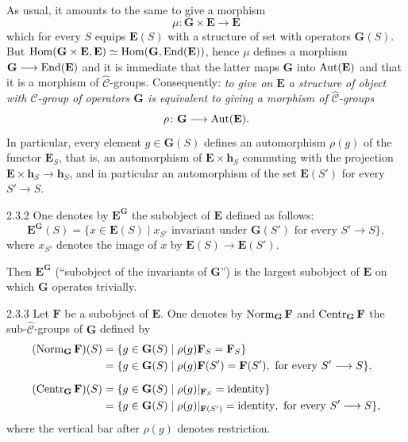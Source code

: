 As usual, it amounts to the same to give a morphism
\[
\mu\colon\mathbf{G}\times\mathbf{E}\to\mathbf{E}
\]
which for every \(S\) equips \(\mathbf{E}(S)\) with a structure of set with
operators \(\mathbf{G}(S)\). But
\(\operatorname{Hom}(\mathbf{G}\times\mathbf{E},\mathbf{E})\simeq\operatorname{Hom}(\mathbf{G},\operatorname{End}(\mathbf{E}))\),
hence \(\mu\) defines a morphism \(\mathbf{G}\longrightarrow\operatorname{End}(\mathbf{E})\) and it is
immediate that the latter maps \(\mathbf{G}\) into \(\operatorname{Aut}(\mathbf{E})\) and
that it is a morphism of \(\widehat{\mathcal{C}}\)-groups. Consequently:
\emph{to give on \(\mathbf{E}\) a structure of object with
\(\widehat{\mathcal{C}}\)-group of operators \(\mathbf{G}\) is equivalent to
giving a morphism of \(\widehat{\mathcal{C}}\)-groups}
\[
\rho\colon\mathbf{G}\longrightarrow\operatorname{Aut}(\mathbf{E}).
\]
In particular, every element \(g\in\mathbf{G}(S)\) defines an automorphism
\(\rho(g)\) of the functor \(\mathbf{E}_{S}\), that is, an automorphism of
\(\mathbf{E}\times\mathbf{h}_{S}\) commuting with the projection
\(\mathbf{E}\times\mathbf{h}_{S}\to\mathbf{h}_{S}\), and in particular an
automorphism of the set \(\mathbf{E}(S')\) for every \(S'\to S\).

\begin{definition}{2.3.2}\label{I.2.3.2}
One denotes by \(\mathbf{E}^{\mathbf{G}}\) the subobject of \(\mathbf{E}\)
defined as follows:
\[
\mathbf{E}^{\mathbf{G}}(S)
=\{x\in\mathbf{E}(S)\mid
x_{S'}\text{ invariant under }\mathbf{G}(S')
\text{ for every }S'\to S\},
\]
where \(x_{S'}\) denotes the image of \(x\) by
\(\mathbf{E}(S)\to\mathbf{E}(S')\).
\end{definition}

Then \(\mathbf{E}^{\mathbf{G}}\) (``subobject of the invariants of
\(\mathbf{G}\)'') is the largest subobject of \(\mathbf{E}\) on which
\(\mathbf{G}\) operates trivially.

\begin{definition}{2.3.3}\label{I.2.3.3}
Let \(\mathbf{F}\) be a subobject of \(\mathbf{E}\). One denotes by
\(\operatorname{Norm}_{\mathbf{G}}\mathbf{F}\) and \(\operatorname{Centr}_{\mathbf{G}}\mathbf{F}\) the
sub-\(\widehat{\mathcal{C}}\)-groups of \(\mathbf{G}\) defined by
\[
\begin{aligned}
(\operatorname{Norm}_{\mathbf{G}}\mathbf{F})(S)
  &=\{g\in\mathbf{G}(S)\mid \rho(g)\mathbf{F}_{S}=\mathbf{F}_{S}\}\\
  &=\{g\in\mathbf{G}(S)\mid
    \rho(g)\mathbf{F}(S')=\mathbf{F}(S'),
    \ \text{for every }S'\longrightarrow S\},\\[0.6em]
(\operatorname{Centr}_{\mathbf{G}}\mathbf{F})(S)
  &=\{g\in\mathbf{G}(S)\mid
    \rho(g)|_{\mathbf{F}_{S}}=\textup{identity}\}\\
  &=\{g\in\mathbf{G}(S)\mid
    \rho(g)|_{\mathbf{F}(S')}=\textup{identity},
    \ \text{for every }S'\longrightarrow S\},
\end{aligned}
\]
where the vertical bar after \(\rho(g)\) denotes restriction.
\end{definition}

